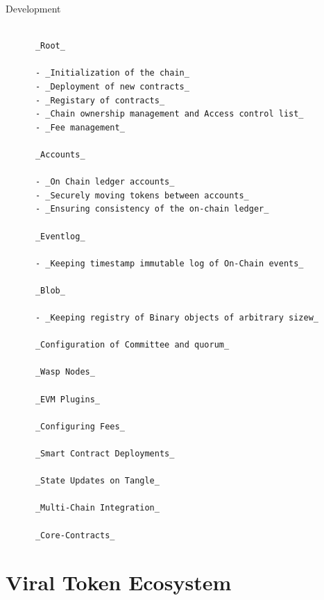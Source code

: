 \documentclass[conference]{IEEEtran}
\begin{document}
Development

\begin{lstlisting}

      _Root_

      - _Initialization of the chain_
      - _Deployment of new contracts_
      - _Registary of contracts_
      - _Chain ownership management and Access control list_
      - _Fee management_

      _Accounts_

      - _On Chain ledger accounts_
      - _Securely moving tokens between accounts_
      - _Ensuring consistency of the on-chain ledger_

      _Eventlog_

      - _Keeping timestamp immutable log of On-Chain events_

      _Blob_

      - _Keeping registry of Binary objects of arbitrary sizew_

      _Configuration of Committee and quorum_

      _Wasp Nodes_

      _EVM Plugins_

      _Configuring Fees_

      _Smart Contract Deployments_

      _State Updates on Tangle_

      _Multi-Chain Integration_

      _Core-Contracts_

\end{lstlisting}

\section{\textbf{Viral Token Ecosystem}}
\end{document}
